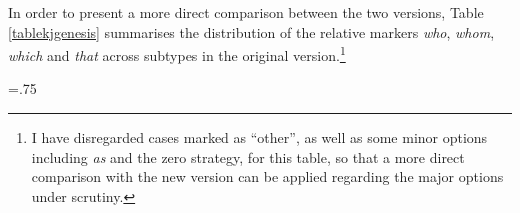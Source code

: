 In order to present a more direct comparison between the two versions, Table \ref{tablekjgenesis} summarises the distribution of the relative markers \textit{who}, \textit{whom}, \textit{which} and \textit{that} across subtypes in the original version.\footnote{I have disregarded cases marked as ``other'', as well as some minor options including \textit{as} and the zero strategy, for this table, so that a more direct comparison with the new version can be applied regarding the major options under scrutiny.}

\begin{table}[p]
\tabcolsep=.75\tabcolsep
{}
\caption{The distribution of relative markers in the KJB}
\label{tablekjgenesis}
\end{table}

